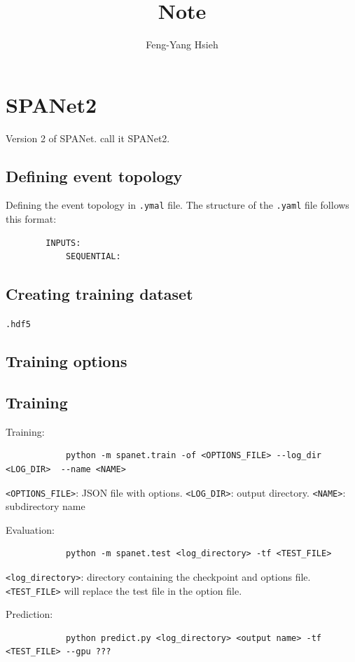 \documentclass[12pt]{article}
\title{Note}
\author{Feng-Yang Hsieh}
\date{}
\begin{document}
\maketitle

\section{SPANet2}%
\label{sec:spanet2}
	Version 2 of SPANet. call it SPANet2. 
	\subsection{Defining event topology}%
	\label{sub:defining_event_topology}
		Defining the event topology in \verb+.ymal+ file. The structure of the \verb+.yaml+ file follows this format:
		\begin{verbatim}
		INPUTS:
		    SEQUENTIAL:
		\end{verbatim}
	\subsection{Creating training dataset}%
	\label{sub:creating_training_dataset}
		\verb+.hdf5+
	\subsection{Training options}%
	\label{sub:training_options}
		
	\subsection{Training}%
	\label{sub:training}
		Training:
		\begin{verbatim}
			python -m spanet.train -of <OPTIONS_FILE> --log_dir <LOG_DIR>  --name <NAME> 
		\end{verbatim}
		\verb+<OPTIONS_FILE>+: JSON file with options. \verb+<LOG_DIR>+: output directory. \verb+<NAME>+: subdirectory name

		Evaluation:
		\begin{verbatim}
			python -m spanet.test <log_directory> -tf <TEST_FILE>
		\end{verbatim}
		\verb+<log_directory>+: directory containing the checkpoint and options file.  \verb+<TEST_FILE>+ will replace the test file in the option file.

		Prediction:
		\begin{verbatim}
			python predict.py <log_directory> <output name> -tf <TEST_FILE> --gpu ???
		\end{verbatim}
	
\end{document}
